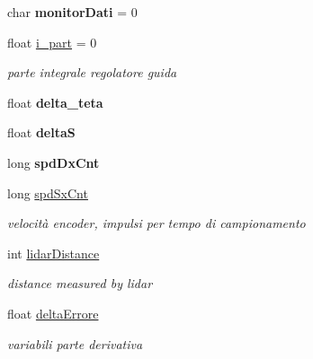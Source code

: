 \begin{DoxyCompactItemize}
char {\bfseries monitor\+Dati} = 0
\item 
\mbox{\label{ari_pi__2_d_c__esp__08_8ino_a76da74d153b9813dd1e568a77a05707b}} 
float \mbox{\hyperlink{ari_pi__2_d_c__esp__08_8ino_a76da74d153b9813dd1e568a77a05707b}{i\+\_\+part}} = 0
\begin{DoxyCompactList}\small\item\em parte integrale regolatore guida \end{DoxyCompactList}\item 
\mbox{\label{ari_pi__2_d_c__esp__08_8ino_aac1a5446ad100de2f39ea367994f0766}} 
float {\bfseries delta\+\_\+teta}
\item 
\mbox{\label{ari_pi__2_d_c__esp__08_8ino_a7fa6816c80e0264d9018d4e59f5a79cd}} 
float {\bfseries deltaS}
\item 
\mbox{\label{ari_pi__2_d_c__esp__08_8ino_adb09a635e5dce1cb72809b635590795f}} 
long {\bfseries spd\+Dx\+Cnt}
\item 
\mbox{\label{ari_pi__2_d_c__esp__08_8ino_ad968c532014efdd0469f8476af86bbbc}} 
long \mbox{\hyperlink{ari_pi__2_d_c__esp__08_8ino_ad968c532014efdd0469f8476af86bbbc}{spd\+Sx\+Cnt}}
\begin{DoxyCompactList}\small\item\em velocità encoder, impulsi per tempo di campionamento \end{DoxyCompactList}\item 
\mbox{\label{ari_pi__2_d_c__esp__08_8ino_a9e213b245d9e31efaa646bd5a7a607ef}} 
int \mbox{\hyperlink{ari_pi__2_d_c__esp__08_8ino_a9e213b245d9e31efaa646bd5a7a607ef}{lidar\+Distance}}
\begin{DoxyCompactList}\small\item\em distance measured by lidar \end{DoxyCompactList}\item 
\mbox{\label{ari_pi__2_d_c__esp__08_8ino_a432a4bb4f42b6564f87ba1463b70d668}} 
float \mbox{\hyperlink{ari_pi__2_d_c__esp__08_8ino_a432a4bb4f42b6564f87ba1463b70d668}{delta\+Errore}}
\begin{DoxyCompactList}\small\item\em variabili parte derivativa \end{DoxyCompactList}\item 

\end{DoxyCompactItemize}
